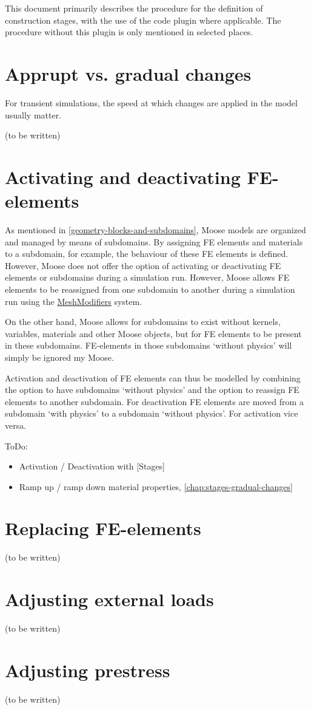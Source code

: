 This document primarily describes the procedure for the definition of
construction stages, with the use of the \codeword{[Stages]} code plugin where
applicable. The procedure without this plugin is only mentioned in selected
places.

\section{Apprupt vs. gradual changes}
\label{chap:stages-gradual-changes}

For transient simulations, the speed at which changes are applied in the model
usually matter.

(to be written)

\section{Activating and deactivating FE-elements}
\label{chap:stages-element-activation-deactivation}

As mentioned in \autoref{geometry-blocks-and-subdomains}, Moose models are
organized and managed by means of subdomains. By assigning FE elements and
materials to a subdomain, for example, the behaviour of these FE elements is
defined. However, Moose does not offer the option of activating or deactivating
FE elements or subdomains during a simulation run. However, Moose allows FE
elements to be reassigned from one subdomain to another during a simulation run
using the
\href{https://mooseframework.inl.gov/syntax/MeshModifiers/index.html}{MeshModifiers}
system.

On the other hand, Moose allows for subdomains to exist without kernels,
variables, materials and other Moose objects, but for FE elements to be present
in these subdomains. FE-elements in those subdomains ‘without physics’ will
simply be ignored my Moose.

Activation and deactivation of FE elements can thus be modelled by combining
the option to have subdomains ‘without physics’ and the option to reassign FE
elements to another subdomain. For deactivation FE elements are moved from a
subdomain ‘with physics’ to a subdomain ‘without physics’. For activation vice
versa.

ToDo:
\begin{itemize}
      \item Activation / Deactivation with [Stages]
      \item Ramp up / ramp down material properties, \autoref{chap:stages-gradual-changes}
\end{itemize}

\section{Replacing FE-elements}
\label{chap:stages-element-replacement}

(to be written)

\section{Adjusting external loads}
\label{chap:stages-loads}

(to be written)

\section{Adjusting prestress}
\label{chap:stages-prestress}

(to be written)